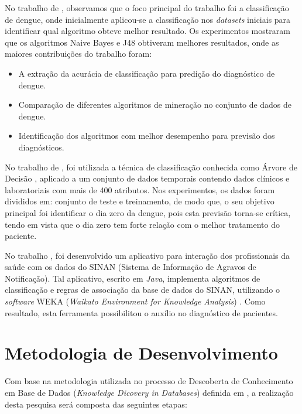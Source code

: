 \documentclass[
	12pt,				%
	openright,			%
	oneside,	
	a4paper,				%
	english,				%
	brazil				%
]{abntex2/abntex2} %
\begin{document}
	No trabalho de \cite{shakil:2015}, observamos que o foco principal do trabalho foi a classificação de dengue, onde inicialmente aplicou-se a classificação nos \textit{datasets} iniciais para identificar qual algoritmo obteve melhor resultado. Os experimentos mostraram que os algoritmos Naive Bayes e J48 obtiveram melhores resultados, onde as maiores contribuições do trabalho foram:
	
	\begin{itemize}
		\item A extração da acurácia de classificação para predição do diagnóstico de dengue.
		\item Comparação de diferentes algoritmos de mineração no conjunto de dados de dengue.
		\item Identificação dos algoritmos com melhor desempenho para previsão dos diagnósticos.
	\end{itemize}
	
	No trabalho de \cite{thitiprayoonwongse:2012}, foi utilizada a técnica de classificação conhecida como Árvore de Decisão \cite{tan:2009}, aplicado a um conjunto de dados temporais contendo dados clínicos e laboratoriais com mais de 400 atributos. Nos experimentos, os dados foram divididos em: conjunto de teste e treinamento, de modo que, o seu objetivo principal foi identificar o dia zero da dengue, pois esta previsão torna-se crítica, tendo em vista que o dia zero tem forte relação com o melhor tratamento do paciente.
	
	No trabalho \cite{santos:2011}, foi desenvolvido um aplicativo para interação dos profissionais da saúde com os dados do SINAN (Sistema de Informação de Agravos de Notificação). Tal aplicativo, escrito em  \textit{Java}\cite{oracle:2015}, implementa algoritmos de classificação e regras de associação da base de dados do SINAN, utilizando o \textit{software} WEKA (\textit{Waikato Environment for Knowledge Analysis}) \cite{weka:2015}. Como resultado, esta ferramenta possibilitou o auxílio no diagnóstico de pacientes.	

	\section{Metodologia de Desenvolvimento}
		
		Com base na metodologia utilizada no processo de Descoberta de Conhecimento em Base de Dados (\textit{Knowledge Dicovery in Databases}) definida em \cite{fayyad:1996}, a realização desta pesquisa será composta das seguintes etapas:
		
\end{document}

